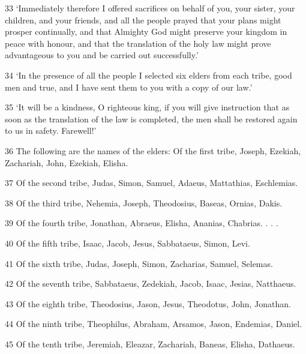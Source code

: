\par 33 ‘Immediately therefore I offered sacrifices on behalf of you, your sister, your children, and your friends, and all the people prayed that your plans might prosper continually, and that Almighty God might preserve your kingdom in peace with honour, and that the translation of the holy law might prove advantageous to you and be carried out successfully.’

\par 34 ‘In the presence of all the people I selected six elders from each tribe, good men and true, and I have sent them to you with a copy of our law.’

\par 35 ‘It will be a kindness, O righteous king, if you will give instruction that as soon as the translation of the law is completed, the men shall be restored again to us in safety. Farewell!’

\par 36 The following are the names of the elders: Of the first tribe, Joseph, Ezekiah, Zachariah, John, Ezekiah, Elisha.

\par 37 Of the second tribe, Judas, Simon, Samuel, Adaeus, Mattathias, Eschlemias.

\par 38 Of the third tribe, Nehemia, Joseph, Theodosius, Baseas, Ornias, Dakis.

\par 39 Of the fourth tribe, Jonathan, Abraeus, Elisha, Ananias, Chabrias. . . .

\par 40 Of the fifth tribe, Isaac, Jacob, Jesus, Sabbataeus, Simon, Levi.

\par 41 Of the sixth tribe, Judas, Joseph, Simon, Zacharias, Samuel, Selemas.

\par 42 Of the seventh tribe, Sabbataeus, Zedekiah, Jacob, Isaac, Jesias, Natthaeus.

\par 43 Of the eighth tribe, Theodosius, Jason, Jesus, Theodotus, John, Jonathan.

\par 44 Of the ninth tribe, Theophilus, Abraham, Arsamos, Jason, Endemias, Daniel.

\par 45 Of the tenth tribe, Jeremiah, Eleazar, Zachariah, Baneas, Elisha, Dathaeus.

